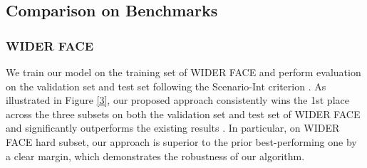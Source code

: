 \documentclass{article} %
\begin{document}



\subsection{Comparison on Benchmarks}

\subsubsection{WIDER FACE}


We train our model on the training set of WIDER FACE and perform
evaluation on the validation set and test set following the Scenario-Int criterion \cite{wider}.
As illustrated in Figure \ref{3}, our proposed approach consistently wins the 1st place across the three subsets on both the validation set and test set of WIDER FACE and significantly outperforms the existing results \cite{ssh,sfd,HR,cmsrcnn,spl,vj2,faceness,wider}.
In particular, on WIDER FACE hard subset, our approach is superior to the prior best-performing one \cite{sfd} by a clear margin, which demonstrates the robustness of our algorithm.
\end{document}
